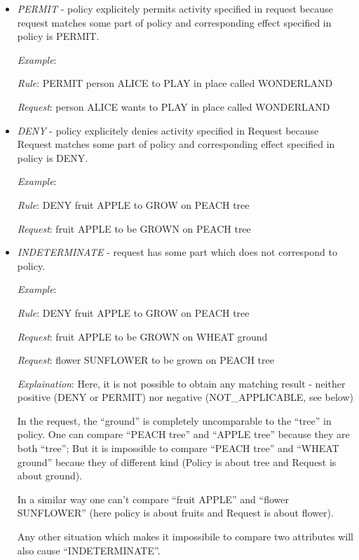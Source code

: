 \documentclass{article}                            %
\begin{document}
\begin{itemize}
    \item  \emph{PERMIT} - policy explicitely permits activity specified in request because request matches some part of policy and corresponding effect specified in policy is PERMIT. 

        \emph{Example}: 

            \emph{Rule}: PERMIT person ALICE to PLAY in place called WONDERLAND

            \emph{Request}: person ALICE wants to PLAY in place called WONDERLAND

    \item  \emph{DENY} - policy explicitely denies activity specified in Request because Request matches some part of policy and corresponding effect specified in policy is DENY.

        \emph{Example}:

            \emph{Rule}: DENY fruit APPLE to GROW on PEACH tree

            \emph{Request}: fruit APPLE to be GROWN on PEACH tree

    \item  \emph{INDETERMINATE} - request has some part which does not correspond to policy.

        \emph{Example}:
 
            \emph{Rule}: DENY fruit APPLE to GROW on PEACH tree

            \emph{Request}: fruit APPLE to be GROWN on WHEAT ground

            \emph{Request}: flower SUNFLOWER to be grown on PEACH tree

        \emph{Explaination}: Here, it is not possible to obtain any matching result - neither positive (DENY or PERMIT) nor negative (NOT\_APPLICABLE, see below)

In the request, the ``ground'' is completely uncomparable to the ``tree'' in policy. One can compare ``PEACH tree'' and ``APPLE tree'' because they are both ``tree''; But it is impossible to compare ``PEACH tree'' and ``WHEAT ground'' becaue they of different kind (Policy is about tree and Request is about ground).

In a similar way one can't compare ``fruit APPLE'' and ``flower SUNFLOWER'' (here policy is about fruits and Request is about flower).

Any other situation which makes it impossibile to compare two attributes will also cause ``INDETERMINATE''.


\end{itemize}
\end{document}
